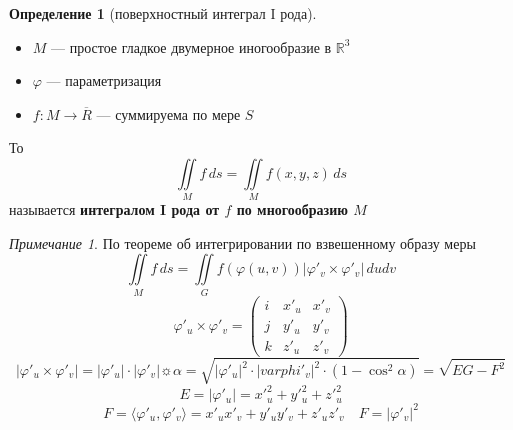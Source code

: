 \documentclass[oneside]{book}
\newcommand{\R}{\mathbb{R}}
\theoremstyle{plain}
\theoremstyle{remark}
\newtheorem*{remark}{Примечание}
\theoremstyle{definition}
\newtheorem*{definition}{Определение}
\begin{document}
\begin{definition}[поверхностный интеграл I рода]
\-
\begin{itemize}
\item \(M\) --- простое гладкое двумерное иногообразие в \(\R^3\)
\item \(\varphi\) --- параметризация
\item \(f: M \to \overline{R}\) --- суммируема по мере \(S\)
\end{itemize}
То \[ \iint\limits_M f\,ds = \iint\limits_M f(x, y, z)\,ds \]
называется \textbf{интегралом I рода от \(f\) по многообразию \(M\)}
\end{definition}
\begin{remark}
По теореме об интегрировании по взвешенному образу меры
\[ \iint\limits_M f\,ds = \iint\limits_G f(\varphi(u, v)) |\varphi'_v \times \varphi'_v|\,dudv \]
\[ \varphi'_u \times \varphi'_v = \begin{pmatrix}
i & x'_u & x'_v \\
j & y'_u & y'_v \\
k & z'_u & z'_v
\end{pmatrix}\]
\[ |\varphi'_u \times \varphi'_v| = |\varphi'_u| \cdot |\varphi'_v|\sun\alpha = \sqrt{|\varphi'_u|^2 \cdot |varphi'_v|^2 \cdot (1 - \cos^2\alpha)} = \sqrt{EG - F^2} \]
\[ E = |\varphi'_u| = x'_u^2 + y'_u^2 + z'_u^2 \]
\[ F = \langle \varphi'_u, \varphi'_v \rangle = x'_ux'_v + y'_uy'_v + z'_u z'_v \quad F = |\varphi'_v|^2 \]
\end{remark}
\end{document}
